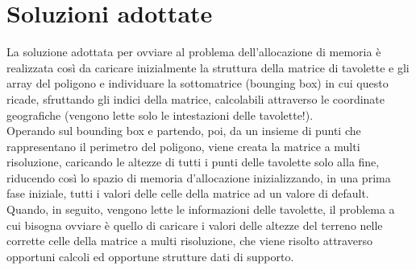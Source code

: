 	\section{Soluzioni adottate}
	La soluzione adottata per ovviare al problema dell'allocazione di memoria \`{e} realizzata cos\`{i} da caricare inizialmente la struttura della matrice di tavolette e gli array del poligono e individuare la sottomatrice (bounging box) in cui questo ricade, sfruttando gli indici della matrice, calcolabili attraverso le coordinate geografiche (vengono lette solo le intestazioni delle tavolette!).\\ 
	Operando sul bounding box e partendo, poi, da un insieme di punti che rappresentano il perimetro del poligono, viene creata la matrice a multi risoluzione, caricando le altezze di tutti i punti delle tavolette solo alla fine, riducendo cos\`{i} lo spazio di memoria d'allocazione inizializzando, in una prima fase iniziale, tutti i valori delle celle della matrice ad un valore di default.
	Quando, in seguito, vengono lette le informazioni delle tavolette, il problema a cui bisogna ovviare \`{e} quello di caricare i valori delle altezze del terreno nelle corrette celle della matrice a multi risoluzione, che viene risolto attraverso opportuni calcoli ed opportune strutture dati di supporto.


